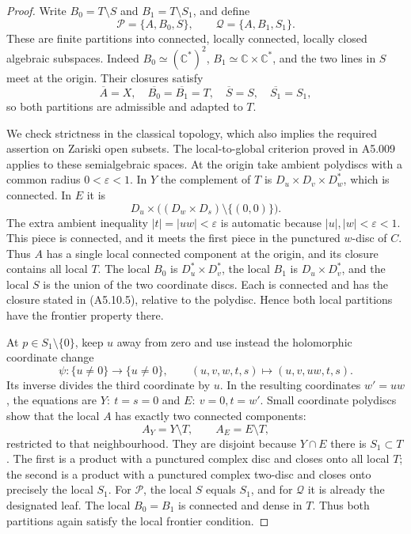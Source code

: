 \begin{proof}
Write $B_0=T\setminus S$ and $B_1=T\setminus S_1$, and define
\[
 \mathcal P=\{A,B_0,S\},\qquad
 \mathcal Q=\{A,B_1,S_1\}.                         \tag{A5.10.4}
\]
These are finite partitions into connected, locally connected,
locally closed algebraic subspaces.  Indeed
$B_0\simeq(\mathbb C^*)^2$, $B_1\simeq\mathbb C\times\mathbb C^*$,
and the two lines in $S$ meet at the origin.  Their closures satisfy
\[
 \overline A=X,\quad\overline{B_0}=\overline{B_1}=T,
 \quad\overline S=S,\quad\overline{S_1}=S_1,
                                                               \tag{A5.10.5}
\]
so both partitions are admissible and adapted to $T$.

We check strictness in the classical topology, which also implies
the required assertion on Zariski open subsets.  The local-to-global
criterion proved in A5.009 applies to these semialgebraic spaces.
At the origin take ambient polydiscs with a common radius
$0<\varepsilon<1$.  In $Y$ the complement of $T$ is
$D_u\times D_v\times D_w^*$, which is connected.  In $E$ it is
\[
 D_u\times\bigl((D_w\times D_s)\setminus\{(0,0)\}\bigr).
\]
The extra ambient inequality $|t|=|uw|<\varepsilon$ is automatic
because $|u|,|w|<\varepsilon<1$.  This piece is connected, and
it meets the first piece in the punctured $w$-disc of $C$.
Thus $A$ has a single local connected component at the origin,
and its closure contains all local $T$.  The local $B_0$ is
$D_u^*\times D_v^*$, the local $B_1$ is $D_u\times D_v^*$,
and the local $S$ is the union of the two coordinate discs.
Each is connected and has the closure stated in (A5.10.5),
relative to the polydisc.  Hence both local partitions have the
frontier property there.

At $p\in S_1\setminus\{0\}$, keep $u$ away from zero and use
instead the holomorphic coordinate change
\[
 \psi:\{u\ne0\}\longrightarrow\{u\ne0\},\qquad
 (u,v,w,t,s)\longmapsto(u,v,uw,t,s).
\]
Its inverse divides the third coordinate by $u$.  In the resulting
coordinates $w'=uw$, the equations are $Y:\ t=s=0$ and
$E:\ v=0,t=w'$.  Small coordinate polydiscs show that the local
$A$ has exactly two connected components:
\[
 A_Y=Y\setminus T,\qquad A_E=E\setminus T,
\]
restricted to that neighbourhood.  They are disjoint because
$Y\cap E$ there is $S_1\subset T$.  The first is a product with a
punctured complex disc and closes onto all local $T$; the second
is a product with a punctured complex two-disc and closes onto
precisely the local $S_1$.  For $\mathcal P$, the local $S$ equals
$S_1$, and for $\mathcal Q$ it is already the designated leaf.
The local $B_0=B_1$ is connected and dense in $T$.  Thus both
partitions again satisfy the local frontier condition.


\end{proof}
